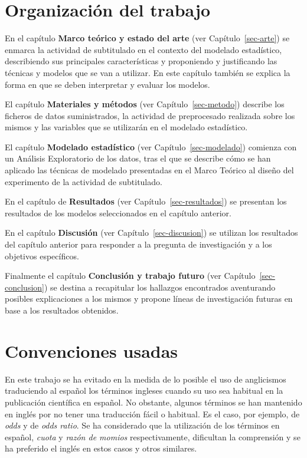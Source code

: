 \documentclass[
  12pt,
  a4paper,
  extrafontsizes,
  onecolumn,
  openright,
  table]{memoir}
\begin{document}
\hypertarget{organizaciuxf3n-del-trabajo}{%
\section{Organización del trabajo}\label{organizaciuxf3n-del-trabajo}}

En el capítulo \textbf{Marco teórico y estado del arte} (ver
Capítulo~\ref{sec-arte}) se enmarca la actividad de subtitulado en el
contexto del modelado estadístico, describiendo sus principales
características y proponiendo y justificando las técnicas y modelos que
se van a utilizar. En este capítulo también se explica la forma en que
se deben interpretar y evaluar los modelos.

El capítulo \textbf{Materiales y métodos} (ver
Capítulo~\ref{sec-metodo}) describe los ficheros de datos suministrados,
la actividad de preprocesado realizada sobre los mismos y las variables
que se utilizarán en el modelado estadístico.

El capítulo \textbf{Modelado estadístico} (ver
Capítulo~\ref{sec-modelado}) comienza con un Análisis Exploratorio de
los datos, tras el que se describe cómo se han aplicado las técnicas de
modelado presentadas en el Marco Teórico al diseño del experimento de la
actividad de subtitulado.

En el capítulo de \textbf{Resultados} (ver
Capítulo~\ref{sec-resultados}) se presentan los resultados de los
modelos seleccionados en el capítulo anterior.

En el capítulo \textbf{Discusión} (ver Capítulo~\ref{sec-discusion}) se
utilizan los resultados del capítulo anterior para responder a la
pregunta de investigación y a los objetivos específicos.

Finalmente el capítulo \textbf{Conclusión y trabajo futuro} (ver
Capítulo~\ref{sec-conclusion}) se destina a recapitular los hallazgos
encontrados aventurando posibles explicaciones a los mismos y propone
líneas de investigación futuras en base a los resultados obtenidos.

\hypertarget{convenciones-usadas}{%
\section{Convenciones usadas}\label{convenciones-usadas}}

En este trabajo se ha evitado en la medida de lo posible el uso de
anglicismos traduciendo al español los términos ingleses cuando su uso
sea habitual en la publicación científica en español. No obstante,
algunos términos se han mantenido en inglés por no tener una traducción
fácil o habitual. Es el caso, por ejemplo, de \emph{odds} y de
\emph{odds ratio}. Se ha considerado que la utilización de los términos
en español, \emph{cuota} y \emph{razón de momios} respectivamente,
dificultan la comprensión y se ha preferido el inglés en estos casos y
otros similares.
\end{document}
